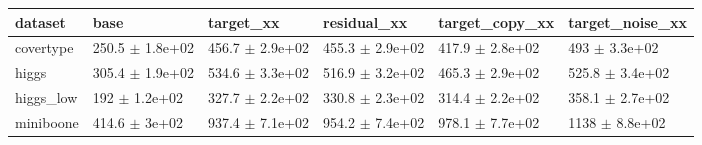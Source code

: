 \begin{tabular}{llllll}
\toprule
dataset & base & target\_xx & residual\_xx & target\_copy\_xx & target\_noise\_xx \\
\midrule
covertype & 250.5 $\pm$ 1.8e+02 & 456.7 $\pm$ 2.9e+02 & 455.3 $\pm$ 2.9e+02 & 417.9 $\pm$ 2.8e+02 & 493 $\pm$ 3.3e+02 \\
higgs & 305.4 $\pm$ 1.9e+02 & 534.6 $\pm$ 3.3e+02 & 516.9 $\pm$ 3.2e+02 & 465.3 $\pm$ 2.9e+02 & 525.8 $\pm$ 3.4e+02 \\
higgs\_low & 192 $\pm$ 1.2e+02 & 327.7 $\pm$ 2.2e+02 & 330.8 $\pm$ 2.3e+02 & 314.4 $\pm$ 2.2e+02 & 358.1 $\pm$ 2.7e+02 \\
miniboone & 414.6 $\pm$ 3e+02 & 937.4 $\pm$ 7.1e+02 & 954.2 $\pm$ 7.4e+02 & 978.1 $\pm$ 7.7e+02 & 1138 $\pm$ 8.8e+02 \\
\bottomrule
\end{tabular}
